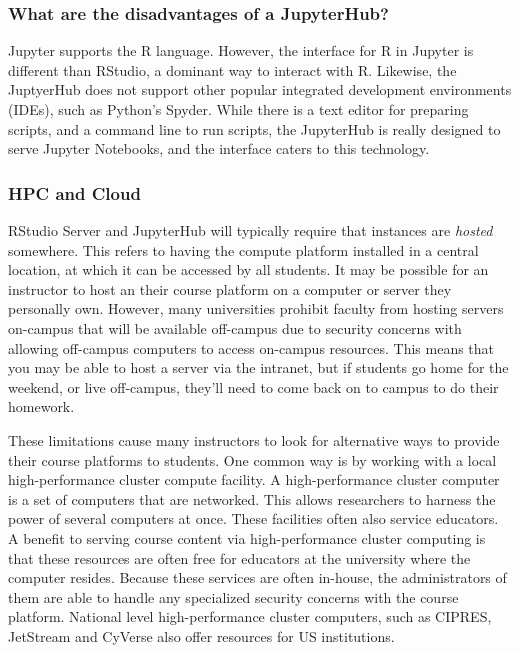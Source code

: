 \subsubsection{What are the disadvantages of a JupyterHub?}

Jupyter supports the R language.
However, the interface for R in Jupyter is different than RStudio, a dominant way to interact with R.
Likewise, the JuptyerHub does not support other popular integrated development environments (IDEs), such as Python's Spyder.
While there is a text editor for preparing scripts, and a command line to run scripts, the JupyterHub is really designed to serve Jupyter Notebooks, and the interface caters to this technology.



\subsubsection{HPC and Cloud}\label{HPC}

RStudio Server and JupyterHub will typically require that instances are \textit{hosted} somewhere.
This refers to having the compute platform installed in a central location, at which it can be accessed by all students.
It may be possible for an instructor to host an their course platform on a computer or server they personally own.
However, many universities prohibit faculty from hosting servers on-campus that will be available off-campus due to security concerns with allowing off-campus computers to access on-campus resources.
This means that you may be able to host a server via the intranet, but if students go home for the weekend, or live off-campus, they'll need to come back on to campus to do their homework.

These limitations cause many instructors to look for alternative ways to provide their course platforms to students.
One common way is by working with a local high-performance cluster compute facility.
A high-performance cluster computer is a set of computers that are networked. 
This allows researchers to harness the power of several computers at once.
These facilities often also service educators.
A benefit to serving course content via high-performance cluster computing is that these resources are often free for educators at the university where the computer resides.
Because these services are often in-house, the administrators of them are able to handle any specialized security concerns with the course platform.
National level high-performance cluster computers, such as CIPRES, JetStream and CyVerse also offer resources for US institutions.

